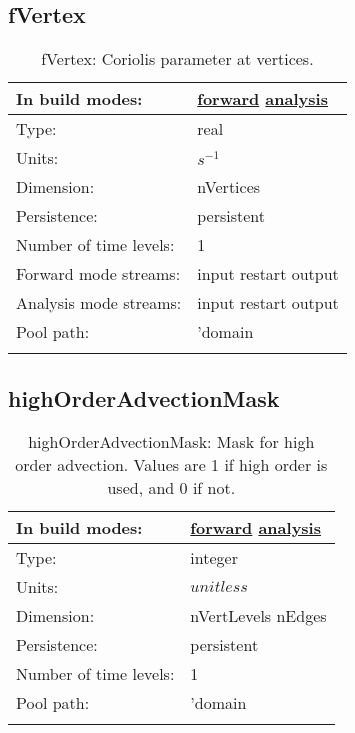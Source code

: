 \subsection[fVertex]{fVertex}
\label{subsec:var_sec_mesh_fVertex}
\begin{center}
\begin{longtable}{| p{2.0in} | p{4.0in} |}
        \hline 
        In build modes: & \hyperref[subsec:forward_var_tab_mesh]{forward} \hyperref[subsec:analysis_var_tab_mesh]{analysis} \\
        \hline 
        Type: & real \\
        \hline 
        Units: & $s^{-1}$ \\
        \hline 
        Dimension: & nVertices \\
        \hline 
        Persistence: & persistent \\
        \hline 
        Number of time levels: & 1 \\
        \hline 
		 Forward mode streams: &  input restart output \\
        \hline 
		 Analysis mode streams: &  input restart output \\
        \hline 
            Pool path: & 'domain %
 \\
		 \hline 
    \caption{fVertex: Coriolis parameter at vertices.}
\end{longtable}
\end{center}
\subsection[highOrderAdvectionMask]{highOrderAdvectionMask}
\label{subsec:var_sec_mesh_highOrderAdvectionMask}
\begin{center}
\begin{longtable}{| p{2.0in} | p{4.0in} |}
        \hline 
        In build modes: & \hyperref[subsec:forward_var_tab_mesh]{forward} \hyperref[subsec:analysis_var_tab_mesh]{analysis} \\
        \hline 
        Type: & integer \\
        \hline 
        Units: & $unitless$ \\
        \hline 
        Dimension: & nVertLevels nEdges \\
        \hline 
        Persistence: & persistent \\
        \hline 
        Number of time levels: & 1 \\
        \hline 
            Pool path: & 'domain %
 \\
		 \hline 
    \caption{highOrderAdvectionMask: Mask for high order advection. Values are 1 if high order is used, and 0 if not.}
\end{longtable}
\end{center}
